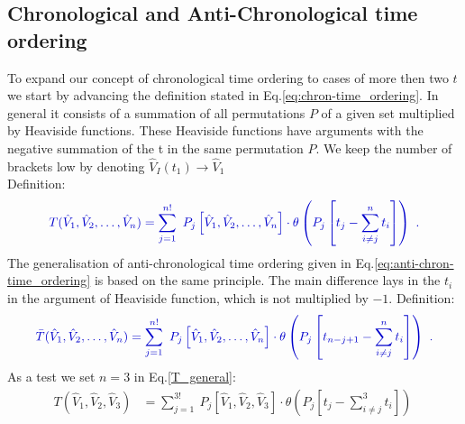\documentclass[12pt, titlepage]{article}
\begin{document}
\begin{subappendices}
\subsection{Chronological and Anti-Chronological time ordering}\label{chronological_time}

To expand our concept  of chronological time ordering to cases of more then  two $  t $ we start by advancing the definition stated in Eq.\enskip\eqref{eq:chron-time_ordering}.
In general it consists of a summation of all permutations $ P $ of a given set multiplied by Heaviside functions. These Heaviside functions have arguments with the negative summation of the t in the same permutation $ P $.
We keep the number of brackets low by denoting $ \hat{V}_{I}(t_{1}) \rightarrow \hat{V}_{1} $ \\
Definition:
\begin{equation}\label{T_general}
\textcolor[RGB]{0,0,204}{
T(\hat{V}_1, \hat{V}_2,\ldots,\hat{V}_n)=
\sum_{j=1}^{n!}\ P_{j}
\left[
\hat{V}_1, \hat{V}_2,\ldots,\hat{V}_n
 \right]  
\cdot
\theta \left(P_{j}\left[t_{j} -\sum_{i\neq j}^{n} t_{i}\right]\right)\ .
}
\end{equation}
The generalisation of anti-chronological time ordering given in Eq.\enskip\eqref{eq:anti-chron-time_ordering} is based on the same principle. The main difference lays in the $ t_i $  in the argument of Heaviside function, which is not multiplied by $-1$.
Definition:
\begin{equation}\label{T_bar_general}
\textcolor[RGB]{0,0,204}{
\bar{T}(\hat{V}_1, \hat{V}_2,\ldots,\hat{V}_n)=
\sum_{j=1}^{n!}\ P_{j}
\left[
\hat{V}_1, \hat{V}_2,\ldots,\hat{V}_n
 \right]  
\cdot
\theta \left(P_{j}\left[t_{n-j+1} -\sum_{i\neq j}^{n} t_{i}\right]\right)\ .
}
\end{equation}
As a test we set $ n=3 $ in Eq.\enskip\eqref{T_general}:
\begin{equation}
\begin{split}
T(\hat{V}_1, \hat{V}_2,\hat{V}_3)
&=
\sum_{j=1}^{3!}\ P_{j}
\left[
\hat{V}_1, \hat{V}_2,\hat{V}_3
 \right]  
\cdot
\theta \left(P_{j}\left[t_{j} -\sum_{i\neq j}^{3} t_{i}\right]\right)\

\end{split}
\end{equation}
\end{subappendices}
\end{document}
